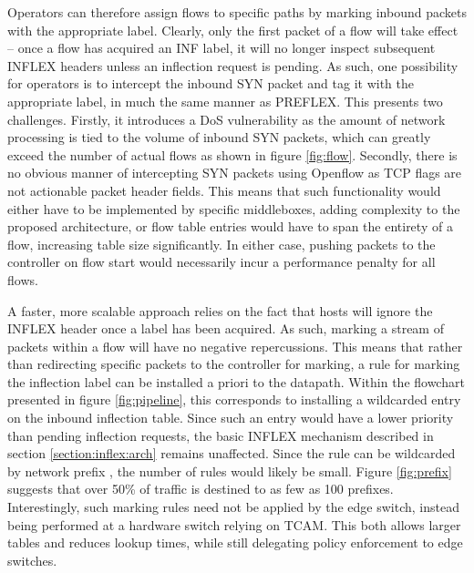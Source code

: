 Operators can therefore assign flows to specific paths by marking inbound packets with the appropriate label.
Clearly, only the first packet of a flow will take effect -- once a flow has acquired an \ac{INF} label, it will no longer inspect subsequent INFLEX headers unless an inflection request is pending.
As such, one possibility for operators is to intercept the inbound SYN packet and tag it with the appropriate label, in much the same manner as \ac{PREFLEX}.
This presents two challenges.
Firstly, it introduces a \ac{DoS} vulnerability as the amount of network processing is tied to the volume of inbound SYN packets, which can greatly exceed the number of actual flows as shown in figure \ref{fig:flow}.
Secondly, there is no obvious manner of intercepting SYN packets using Openflow as \ac{TCP} flags are not actionable packet header fields.
This means that such functionality would either have to be implemented by specific middleboxes, adding complexity to the proposed architecture, or flow table entries would have to span the entirety of a flow, increasing table size significantly.
In either case, pushing packets to the controller on flow start would necessarily incur a performance penalty for all flows.

A faster, more scalable approach relies on the fact that hosts will ignore the INFLEX header once a label has been acquired.
As such, marking a stream of packets within a flow will have no negative repercussions.
This means that rather than redirecting specific packets to the controller for marking, a rule for marking the inflection label can be installed a priori to the datapath.
Within the flowchart presented in figure \ref{fig:pipeline}, this corresponds to installing a wildcarded entry on the inbound inflection table.
Since such an entry would have a lower priority than pending inflection requests, the basic INFLEX mechanism described in section \ref{section:inflex:arch} remains unaffected.
Since the rule can be wildcarded by network prefix , the number of rules would likely be small. 
Figure \ref{fig:prefix} suggests that over 50\% of traffic is destined to as few as 100 prefixes.
Interestingly, such marking rules need not be applied by the edge switch, instead being performed at a hardware switch relying on \ac{TCAM}.
This both allows larger tables and reduces lookup times, while still delegating policy enforcement to edge switches.

